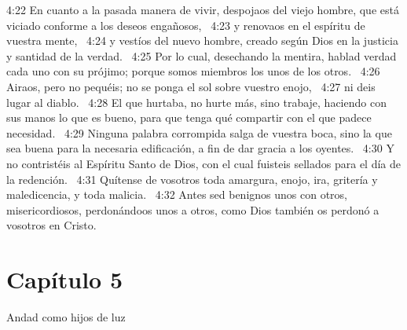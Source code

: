 4:22 En cuanto a la pasada manera de vivir, despojaos del viejo hombre, que está viciado conforme a los deseos engañosos,  
4:23 y renovaos en el espíritu de vuestra mente,  
4:24 y vestíos del nuevo hombre, creado según Dios en la justicia y santidad de la verdad.  
4:25 Por lo cual, desechando la mentira, hablad verdad cada uno con su prójimo; porque somos miembros los unos de los otros.  
4:26 Airaos, pero no pequéis; no se ponga el sol sobre vuestro enojo,  
4:27 ni deis lugar al diablo.  
4:28 El que hurtaba, no hurte más, sino trabaje, haciendo con sus manos lo que es bueno, para que tenga qué compartir con el que padece necesidad.  
4:29 Ninguna palabra corrompida salga de vuestra boca, sino la que sea buena para la necesaria edificación, a fin de dar gracia a los oyentes.  
4:30 Y no contristéis al Espíritu Santo de Dios, con el cual fuisteis sellados para el día de la redención.  
4:31 Quítense de vosotros toda amargura, enojo, ira, gritería y maledicencia, y toda malicia.  
4:32 Antes sed benignos unos con otros, misericordiosos, perdonándoos unos a otros, como Dios también os perdonó a vosotros en Cristo. 
\section*{Capítulo 5 }
Andad como hijos de luz  

